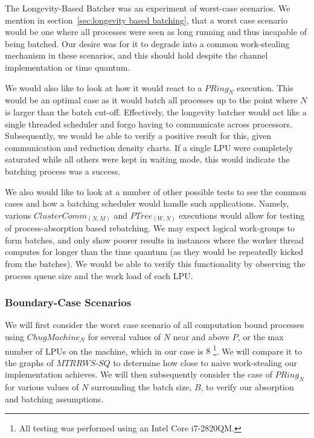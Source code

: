 The Longevity-Based Batcher was an experiment of worst-case scenarios. We
mention in section~\ref{sec:longevity based batching}, that a worst case 
scenario would be one where all processes were seen as long running and 
thus incapable of being batched. Our desire was for it to degrade into 
a common work-stealing mechanism in these scenarios, and this should hold despite 
the channel implementation or time quantum.

We would also like to look at how it would react to a $PRing_N$ execution. This
would be an optimal case as it would batch all processes up to the point where
$N$ is larger than the batch cut-off. Effectively, the longevity batcher would
act like a single threaded scheduler and forgo having to communicate across
processors. Subsequently, we would be able to verify a positive result for this, given
communication and reduction density charts. If a single LPU were completely
saturated while all others were kept in waiting mode, this would indicate the
batching process was a success.

We also would like to look at a number of other possible tests to see the
common cases and how a batching scheduler would handle such applications.
Namely, various $ClusterComm_{(N,M)}$ and $PTree_{(W,N)}$ executions would allow 
for testing of process-absorption based rebatching. We may expect logical
work-groups to form batches, and only show poorer results in instances where
the worker thread computes for longer than the time quantum (as they would be
repeatedly kicked from the batches). We would be able
to verify this functionality by observing the process queue size and the work
load of each LPU. 


\subsubsection{Boundary-Case Scenarios}\label{sec:results-longbatcher-worstcase}

We will first consider the worst case scenario of all computation bound processes 
using $ChugMachine_N$ for several values of $N$ near and 
above $P$, or the max number of LPUs on the machine, which in our case 
is $8$ \footnote{All testing was performed using an Intel Core i7-2820QM.}.  We will 
compare it to the graphs of $MTRRWS$-$SQ$ to determine how close to naive
work-stealing our implementation achieves. We will then subsequently consider
the case of $PRing_N$ for various values of $N$ surrounding the batch size, $B$,
to verify our absorption and batching assumptions.

